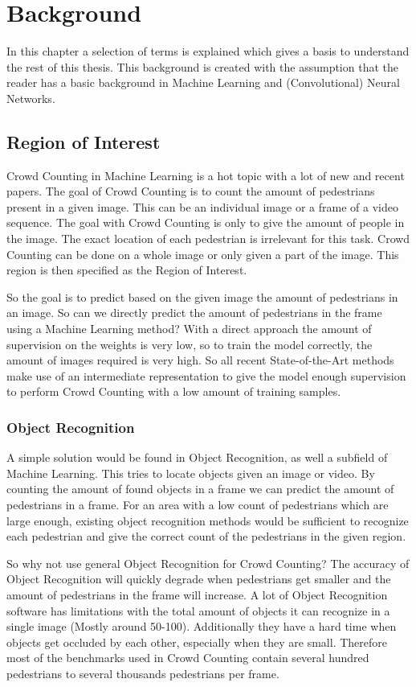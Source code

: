 \chapter{Background}
In this chapter a selection of terms is explained which gives a basis to understand the rest of this thesis. This background is created with the assumption that the reader has a basic background in Machine Learning and (Convolutional) Neural Networks.

\section{Region of Interest}
Crowd Counting in Machine Learning is a hot topic with a lot of new and recent papers. The goal of Crowd Counting is to count the amount of pedestrians present in a given image. This can be an individual image or a frame of a video sequence. The goal with Crowd Counting is only to give the amount of people in the image. The exact location of each pedestrian is irrelevant for this task. Crowd Counting can be done on a whole image or only given a part of the image. This region is then specified as the Region of Interest.

So the goal is to predict based on the given image the amount of pedestrians in an image. So can we directly predict the amount of pedestrians in the frame using a Machine Learning method? With a direct approach the amount of supervision on the weights is very low, so to train the model correctly, the amount of images required is very high. So all recent State-of-the-Art methods make use of an intermediate representation to give the model enough supervision to perform Crowd Counting with a low amount of training samples.

\subsection{Object Recognition}
A simple solution would be found in Object Recognition, as well a subfield of Machine Learning. This tries to locate objects given an image or video. By counting the amount of found objects in a frame we can predict the amount of pedestrians in a frame. For an area with a low count of pedestrians which are large enough, existing object recognition methods would be sufficient to recognize each pedestrian and give the correct count of the pedestrians in the given region.

So why not use general Object Recognition for Crowd Counting? The accuracy of Object Recognition will quickly degrade when pedestrians get smaller and the amount of pedestrians in the frame will increase. A lot of Object Recognition software has limitations with the total amount of objects it can recognize in a single image (Mostly around 50-100). Additionally they have a hard time when objects get occluded by each other, especially when they are small.
Therefore most of the benchmarks used in Crowd Counting contain several hundred pedestrians to several thousands pedestrians per frame.

